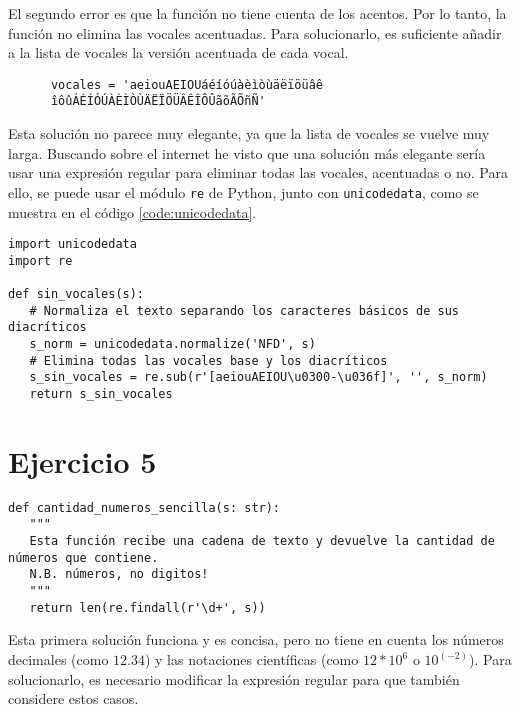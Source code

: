 \begin{paracol}{2}
   El segundo error es que la función no tiene cuenta de los acentos. Por lo tanto, la función no elimina las vocales acentuadas. Para solucionarlo, es suficiente añadir a la lista de vocales la versión acentuada de cada vocal.

   \begin{verbatim}
      vocales = 'aeiouAEIOUáéíóúàèìòùäëïöüâê
      îôûÁÉÍÓÚÀÈÌÒÙÄËÏÖÜÂÊÎÔÛãõÃÕñÑ'
   \end{verbatim}

   Esta solución no parece muy elegante, ya que la lista de vocales se vuelve muy larga. Buscando sobre el internet he visto que una solución más elegante sería usar una expresión regular para eliminar todas las vocales, acentuadas o no. Para ello, se puede usar el módulo \lstinline{re} de Python, junto con \lstinline{unicodedata}, como se muestra en el código \ref{code:unicodedata}.

   \switchcolumn
   \begin{lstlisting}[label={code:unicodedata},caption={Código para eliminar vocales y diacríticos}]
import unicodedata
import re

def sin_vocales(s):
   # Normaliza el texto separando los caracteres básicos de sus diacríticos
   s_norm = unicodedata.normalize('NFD', s)
   # Elimina todas las vocales base y los diacríticos
   s_sin_vocales = re.sub(r'[aeiouAEIOU\u0300-\u036f]', '', s_norm)
   return s_sin_vocales
   \end{lstlisting}
\end{paracol}

\newpage
\section{Ejercicio 5}
\begin{lstlisting}[caption={Solución sencilla}]
def cantidad_numeros_sencilla(s: str):
   """
   Esta función recibe una cadena de texto y devuelve la cantidad de números que contiene.
   N.B. números, no digitos!
   """
   return len(re.findall(r'\d+', s))
\end{lstlisting}

Esta primera solución funciona y es concisa, pero no tiene en cuenta los números decimales (como $12.34$) y las notaciones científicas (como $12*10^6$ o $10^(-2)$). 
Para solucionarlo, es necesario modificar la expresión regular para que también considere estos casos.


